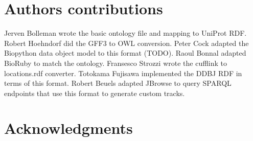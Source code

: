 \documentclass[10pt]{bmc_article}
\newenvironment{bmcformat}{\begin{raggedright}\baselineskip20pt\sloppy\setboolean{publ}{false}}{\end{raggedright}\baselineskip20pt\sloppy}
\begin{document}
\begin{bmcformat}
\section{Authors contributions}

Jerven Bolleman wrote the basic ontology file and mapping to UniProt RDF.
Robert Hoehndorf did the GFF3 to OWL conversion.
Peter Cock adapted the Biopython data object model to this format (TODO).
Raoul Bonnal adapted BioRuby to match the ontology.
Fransesco Strozzi wrote the cufflink to locations.rdf converter.
Totokama Fujisawa implemented the DDBJ RDF in terms of this format.
Robert Beuels adapted JBrowse to query SPARQL endpoints that use this format to generate custom tracks. 

\section{Acknowledgments}



\newpage
{
   }     %
  
\end{bmcformat}
\end{document}
